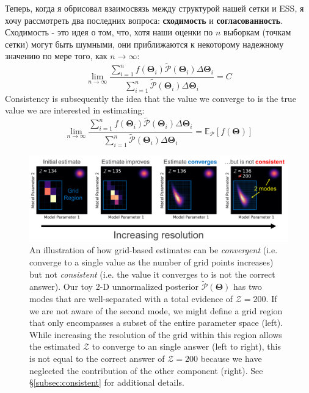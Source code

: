 \documentclass[12pt, titlepage]{article}
\newcommand{\meanwrt}[2]{\ensuremath{\mathbb{E}_{{#2}}\left[{#1}\right]}}
\newcommand{\params}{\ensuremath{\boldsymbol\Theta}}
\newcommand{\posterior}{\ensuremath{\mathcal{P}}}
\newcommand{\evidence}{\ensuremath{\mathcal{Z}}}
\begin{document}
Теперь, когда я обрисовал взаимосвязь между структурой нашей сетки и ESS, я хочу рассмотреть два последних вопроса: \textbf{сходимость} и \textbf{согласованность}. Сходимость - это идея о том, что, хотя наши оценки по $n$ выборкам (точкам сетки) могут быть шумными, они приближаются к некоторому надежному значению по мере того, как $n \rightarrow \infty$:
\begin{equation}
    \lim_{n \rightarrow \infty} \frac{\sum_{i=1}^{n} f(\params_i) 
    \tilde{\posterior}(\params_i) \Delta \params_i}
    {\sum_{i=1}^{n}\tilde{\posterior}(\params_i) \Delta \params_i}
    = C
\end{equation}
Consistency is subsequently the idea that the value we converge to
is the true value we are interested in estimating:
\begin{equation}
    \lim_{n \rightarrow \infty} \frac{\sum_{i=1}^{n} f(\params_i) 
    \tilde{\posterior}(\params_i) \Delta \params_i}
    {\sum_{i=1}^{n}\tilde{\posterior}(\params_i) \Delta \params_i}
    = \meanwrt{f(\params)}{\posterior}
\end{equation}

\begin{figure}
\begin{center}
\includegraphics[width=\textwidth]{figures/fig5.png}
\end{center}
\caption{An illustration of how grid-based estimates can be \textit{convergent}
(i.e. converge to a single value as the number of grid points increases)
but not \textit{consistent} (i.e. the value it converges to is not the correct answer).
Our toy 2-D unnormalized posterior $\tilde{\posterior}(\params)$ has
two modes that are well-separated with a total evidence of $\evidence = 200$.
If we are not aware of the second mode, we might define a grid region
that only encompasses a subset of the entire parameter space (left). 
While increasing the resolution of the grid within this region allows the estimated
$\evidence$ to converge to an single answer (left to right),
this is not equal to the correct answer of $\evidence = 200$
because we have neglected the contribution of the other component
(right). See \S\ref{subsec:consistent} for additional details.
}\label{fig:conv}
\end{figure}
\end{document}

